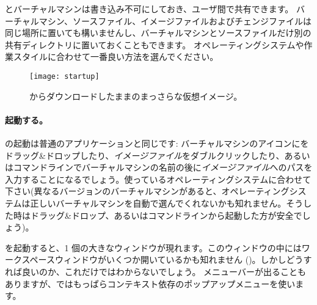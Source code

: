 \documentclass[a4paper,10pt,twoside]{book}
\begin{document}
とバーチャルマシンは書き込み不可にしておき、ユーザ間で共有できます。
バーチャルマシン、ソースファイル、イメージファイルおよびチェンジファイルは同じ場所に置いても構いませんし、バーチャルマシンとソースファイルだけ別の共有ディレクトリに置いておくこともできます。
オペレーティングシステムや作業スタイルに合わせて一番良い方法を選んでください。


\begin{figure}[htb]
\centerline {\texttt{[image: startup]}}
\caption{\pbe からダウンロードしたままのまっさらな仮想イメージ。}
\end{figure}

\paragraph{起動する。} \pharo の起動は普通のアプリケーションと同じです: バーチャルマシンのアイコンにをドラッグ\&ドロップしたり、\emph{イメージファイル}をダブルクリックしたり、あるいはコマンドラインでバーチャルマシンの名前の後に\emph{イメージファイル}へのパスを入力することになるでしょう。使っているオペレーティングシステムに合わせて下さい(異なるバージョンのバーチャルマシンがあると、オペレーティングシステムは正しいバーチャルマシンを自動で選んでくれないかも知れません。そうした時はドラッグ\&ドロップ、あるいはコマンドラインから起動した方が安全でしょう)。

\pharo を起動すると、1 個の大きなウィンドウが現れます。このウィンドウの中にはワークスペースウィンドウがいくつか開いているかも知れません ()。しかしどうすれば良いのか、これだけではわからないでしょう。
メニューバーが出ることもありますが、\pharo ではもっぱらコンテキスト依存のポップアップメニューを使います。

\end{document}
